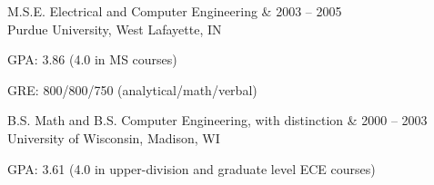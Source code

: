 \documentclass[letterpaper]{scrartcl}
\begin{document}
\begin{list1}
\item
  \begin{tabular1bold}M.S.E. Electrical and Computer Engineering & 2003 -- 2005 \\
    Purdue University, West Lafayette, IN
  \end{tabular1bold}

  \begin{list2}
  \item GPA: 3.86 (4.0 in MS courses)
  \item GRE: 800/800/750 (analytical/math/verbal)
  \end{list2}
\item
  \begin{tabular1bold}B.S. Math and B.S. Computer Engineering, with distinction & 2000 -- 2003 \\
    University of Wisconsin, Madison, WI
  \end{tabular1bold}

  \begin{list2}
  \item GPA: 3.61 (4.0 in upper-division and graduate level ECE courses)
  \end{list2}

\end{list1}
\end{document}
